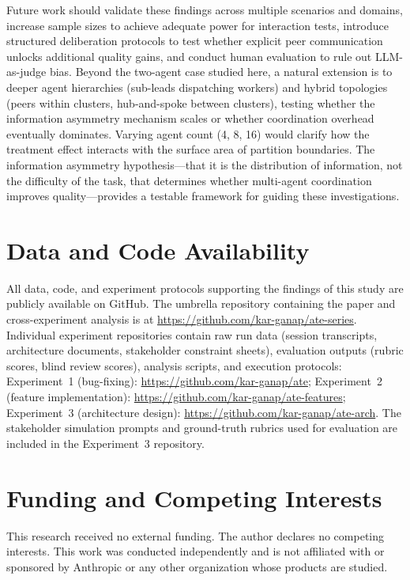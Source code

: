 \documentclass[11pt,letterpaper]{article}
\begin{document}
Future work should validate these findings across multiple scenarios
and domains, increase sample sizes to achieve adequate power for
interaction tests, introduce structured deliberation protocols to
test whether explicit peer communication unlocks additional quality
gains, and conduct human evaluation to rule out LLM-as-judge bias.
Beyond the two-agent case studied here, a natural extension is to
deeper agent hierarchies (sub-leads dispatching workers) and hybrid
topologies (peers within clusters, hub-and-spoke between clusters),
testing whether the information asymmetry mechanism scales or whether
coordination overhead eventually dominates. Varying agent count
(4, 8, 16) would clarify how the treatment effect interacts with the
surface area of partition boundaries.
The information asymmetry hypothesis---that it is the distribution
of information, not the difficulty of the task, that determines
whether multi-agent coordination improves quality---provides a
testable framework for guiding these investigations.

\section*{Data and Code Availability}

All data, code, and experiment protocols supporting the findings of this study are publicly available on GitHub.
The umbrella repository containing the paper and cross-experiment analysis is at \url{https://github.com/kar-ganap/ate-series}.
Individual experiment repositories contain raw run data (session transcripts, architecture documents, stakeholder constraint sheets), evaluation outputs (rubric scores, blind review scores), analysis scripts, and execution protocols:
Experiment~1 (bug-fixing): \url{https://github.com/kar-ganap/ate};
Experiment~2 (feature implementation): \url{https://github.com/kar-ganap/ate-features};
Experiment~3 (architecture design): \url{https://github.com/kar-ganap/ate-arch}.
The stakeholder simulation prompts and ground-truth rubrics used for evaluation are included in the Experiment~3 repository.

\section*{Funding and Competing Interests}
This research received no external funding. The author declares no competing interests. This work was conducted independently and is not affiliated with or sponsored by Anthropic or any other organization whose products are studied.



\end{document}
